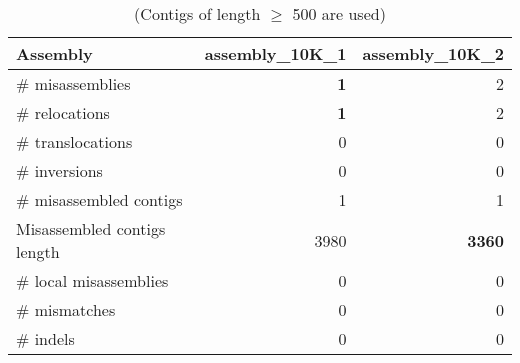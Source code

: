 \documentclass[12pt,a4paper]{article}
\begin{document}
\begin{table}[ht]
\begin{center}
\caption{(Contigs of length $\geq$ 500 are used)}
\begin{tabular}{|l*{2}{|r}|}
\hline
Assembly & assembly\_10K\_1 & assembly\_10K\_2 \\ \hline
\# misassemblies & {\bf 1} & 2 \\ \hline
    \# relocations & {\bf 1} & 2 \\ \hline
    \# translocations & 0 & 0 \\ \hline
    \# inversions & 0 & 0 \\ \hline
\# misassembled contigs & 1 & 1 \\ \hline
Misassembled contigs length & 3980 & {\bf 3360} \\ \hline
\# local misassemblies & 0 & 0 \\ \hline
\# mismatches & 0 & 0 \\ \hline
\# indels & 0 & 0 \\ \hline
\end{tabular}
\end{center}
\end{table}
\end{document}
